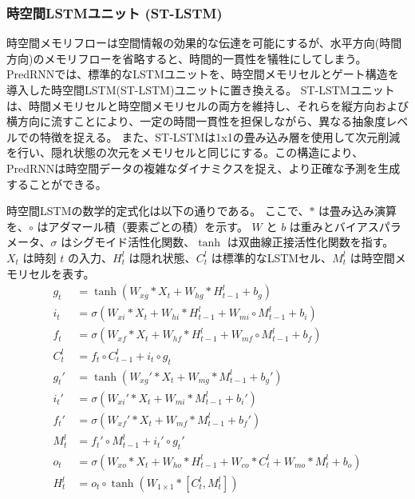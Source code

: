         \subsubsection{時空間LSTMユニット (ST-LSTM)}
          時空間メモリフローは空間情報の効果的な伝達を可能にするが、水平方向(時間方向)のメモリフローを省略すると、時間的一貫性を犠牲にしてしまう。
          PredRNNでは、標準的なLSTMユニットを、時空間メモリセルとゲート構造を導入した時空間LSTM(ST-LSTM)ユニットに置き換える。
          ST-LSTMユニットは、時間メモリセルと時空間メモリセルの両方を維持し、それらを縦方向および横方向に流すことにより、一定の時間一貫性を担保しながら、異なる抽象度レベルでの特徴を捉える。
          また、ST-LSTMは1x1の畳み込み層を使用して次元削減を行い、隠れ状態の次元をメモリセルと同じにする。この構造により、PredRNNは時空間データの複雑なダイナミクスを捉え、より正確な予測を生成することができる。

          時空間LSTMの数学的定式化は以下の通りである。
          ここで、\( \ast \) は畳み込み演算を、\( \circ \) はアダマール積（要素ごとの積）を示す。
          \( W \) と \( b \) は重みとバイアスパラメータ、\( \sigma \) はシグモイド活性化関数、\( \tanh \) は双曲線正接活性化関数を指す。
          \( X_t \) は時刻 \( t \) の入力、\( H_t^l \) は隠れ状態、\( C_t^l \) は標準的なLSTMセル、\( M_t^l \) は時空間メモリセルを表す。
          \begin{align}
          g_t &= \tanh(W_{xg} \ast X_t + W_{hg} \ast H_{t-1}^l + b_g) \\
          i_t &= \sigma(W_{xi} \ast X_t + W_{hi} \ast H_{t-1}^l + W_{mi} \circ M_{t-1}^l + b_i) \\
          f_t &= \sigma(W_{xf} \ast X_t + W_{hf} \ast H_{t-1}^l + W_{mf} \circ M_{t-1}^l + b_f) \\
          C_t^l &= f_t \circ C_{t-1}^l + i_t \circ g_t \\
          g_t' &= \tanh(W_{xg}' \ast X_t + W_{mg} \ast M_{t-1}^l + b_g') \\
          i_t' &= \sigma(W_{xi}' \ast X_t + W_{mi} \ast M_{t-1}^l + b_i') \\
          f_t' &= \sigma(W_{xf}' \ast X_t + W_{mf} \ast M_{t-1}^l + b_f') \\
          M_t^l &= f_t' \circ M_{t-1}^l + i_t' \circ g_t' \\
          o_t &= \sigma(W_{xo} \ast X_t + W_{ho} \ast H_{t-1}^l + W_{co} \ast C_t^l + W_{mo} \ast M_t^l + b_o) \\
          H_t^l &= o_t \circ \tanh(W_{1 \times 1} \ast [C_t^l, M_t^l])
          \end{align}
          
